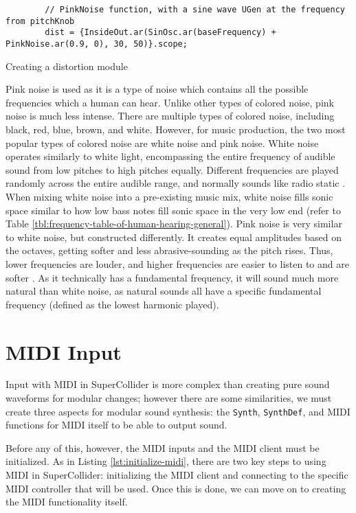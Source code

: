 \begin{listing}
	\begin{lstlisting}
		// PinkNoise function, with a sine wave UGen at the frequency from pitchKnob
		dist = {InsideOut.ar(SinOsc.ar(baseFrequency) + PinkNoise.ar(0.9, 0), 30, 50)}.scope;
	\end{lstlisting}
	\caption{Creating a distortion module}
	\label{lst:distortion-waveforms}
\end{listing}

Pink noise is used as it is a type of noise which contains all the possible frequencies which a human can hear. Unlike other types of colored noise, pink noise is much less intense. There are multiple types of colored noise, including black, red, blue, brown, and white. However, for music production, the two most popular types of colored noise are white noise and pink noise. White noise operates similarly to white light, encompassing the entire frequency of audible sound from low pitches to high pitches equally. Different frequencies are played randomly across the entire audible range, and normally sounds like radio static \cite{Unison_2021}. When mixing white noise into a pre-existing music mix, white noise fills sonic space similar to how low bass notes fill sonic space in the very low end (refer to Table \ref{tbl:frequency-table-of-human-hearing-general}). Pink noise is very similar to white noise, but constructed differently. It creates equal amplitudes based on the octaves, getting softer and less abrasive-sounding as the pitch rises. Thus, lower frequencies are louder, and higher frequencies are easier to listen to and are softer \cite{Unison_2021}. As it technically has a fundamental frequency, it will sound much more natural than white noise, as natural sounds all have a specific fundamental frequency (defined as the lowest harmonic played).

\section{MIDI Input}\label{section:midi-input}

Input with MIDI in SuperCollider is more complex than creating pure sound waveforms for modular changes; however there are some similarities, we must create three aspects for modular sound synthesis: the \texttt{Synth}, \texttt{SynthDef}, and MIDI functions for MIDI itself to be able to output sound. 

Before any of this, however, the MIDI inputs and the MIDI client must be initialized. As in Listing \ref{lst:initialize-midi}, there are two key steps to using MIDI in SuperCollider: initializing the MIDI client and connecting to the specific MIDI controller that will be used. Once this is done, we can move on to creating the MIDI functionality itself.

